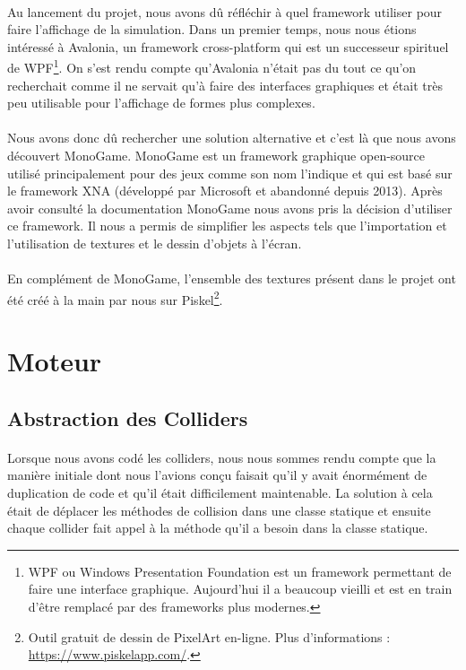 \documentclass{EPUProjetDi}
\begin{document}
\paragraph{}
Au lancement du projet, nous avons dû réfléchir à quel framework utiliser pour faire l'affichage de la simulation.
Dans un premier temps, nous nous étions intéressé à Avalonia, un framework cross-platform qui est un successeur spirituel de WPF\footnote{WPF ou Windows Presentation Foundation est un framework permettant
de faire une interface graphique. Aujourd'hui il a beaucoup vieilli et est en train d'être remplacé par des frameworks plus modernes.}.
On s'est rendu compte qu'Avalonia n'était pas du tout ce qu'on recherchait comme il ne servait qu'à faire des interfaces graphiques et était très peu utilisable pour l'affichage de formes plus complexes.

\paragraph{}
Nous avons donc dû rechercher une solution alternative et c'est là que nous avons découvert MonoGame. 
MonoGame est un framework graphique open-source utilisé principalement pour des jeux comme son nom l'indique et qui est basé
sur le framework XNA (développé par Microsoft et abandonné depuis 2013). 
Après avoir consulté la documentation MonoGame nous avons pris la décision d'utiliser ce framework. Il nous a permis de simplifier les aspects tels que l'importation et l'utilisation de textures
et le dessin d'objets à l'écran.

\paragraph{}
En complément de MonoGame, l'ensemble des textures présent dans le projet ont été créé à la main par nous sur Piskel\footnote{Outil gratuit de dessin de PixelArt en-ligne. 
Plus d'informations : \url{https://www.piskelapp.com/}.}. 

\section{Moteur}

\subsection{Abstraction des Colliders}

\paragraph{}
Lorsque nous avons codé les colliders, nous nous sommes rendu compte que la manière initiale dont nous l'avions conçu
faisait qu'il y avait énormément de duplication de code et qu'il était difficilement maintenable.
La solution à cela était de déplacer les méthodes de collision dans une classe statique et ensuite chaque collider fait appel à la méthode qu'il a besoin dans la classe statique.
\end{document}
